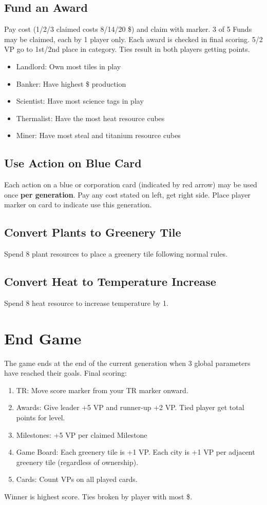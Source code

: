 \documentclass[12pt]{article}
\newenvironment{enumerateCustom}
{\begin{enumerate}
  \setlength{\itemsep}{1pt}
  \setlength{\parskip}{0pt}
  \setlength{\parsep}{0pt}}
{\end{enumerate}}
\newenvironment{itemizeCustom}
{\begin{itemize}
  \setlength{\itemsep}{1pt}
  \setlength{\parskip}{0pt}
  \setlength{\parsep}{0pt}}
{\end{itemize}}
\begin{document}
\begin{multicols*}{2}
    \subsection*{Fund an Award}
    Pay cost (1/2/3 claimed costs 8/14/20 \$) and claim with marker. 3 of 5 Funds may be claimed, each by 1 player only. Each award is checked in final scoring. 5/2 VP go to 1st/2nd place in category. Ties result in both players getting points.
    \begin{itemizeCustom}
        \item Landlord: Own most tiles in play
        \item Banker: Have highest \$ production
        \item Scientist: Have most science tags in play
        \item Thermalist: Have the most heat resource cubes
        \item Miner: Have most steal and titanium resource cubes
    \end{itemizeCustom}

    \subsection*{Use Action on Blue Card}
    Each action on a blue or corporation card (indicated by red arrow) may be used once \textbf{per generation}. Pay any cost stated on left, get right side. Place player marker on card to indicate use this generation.

    \subsection*{Convert Plants to Greenery Tile}
    Spend 8 plant resources to place a greenery tile following normal rules.

    \subsection*{Convert Heat to Temperature Increase}
    Spend 8 heat resource to increase temperature by 1.

\section*{End Game}
The game ends at the end of the current generation when 3 global parameters have reached their goals. Final scoring:
\begin{enumerateCustom}
    \item TR: Move score marker from your TR marker onward.
    \item Awards: Give leader +5 VP and runner-up +2 VP. Tied player get total points for level.
    \item Milestones: +5 VP per claimed Milestone
    \item Game Board: Each greenery tile is +1 VP. Each city is +1 VP per adjacent greenery tile (regardless of ownership).
    \item Cards: Count VPs on all played cards.
\end{enumerateCustom}
Winner is highest score. Ties broken by player with most \$.


\end{multicols*}
\end{document}
